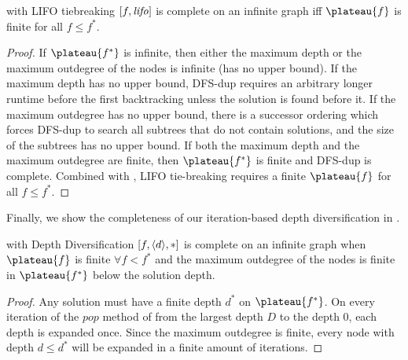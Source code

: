 \begin{propo} %
 \astar with LIFO tiebreaking $[f,{\text{\textit{lifo}}}]$ is complete on an infinite graph iff
 $\plateau{f}$ is finite for all $f\leq f^*$.
\end{propo}

\begin{proof}
 If $\plateau{f^*}$ is infinite, then
 either the maximum depth or the maximum outdegree of the nodes is infinite (has no upper bound).
 If the maximum depth has no upper bound,
 DFS-dup requires an arbitrary longer runtime before the first backtracking
 unless the solution is found before it.
 If the maximum outdegree has no upper bound,
 there is a successor ordering which forces DFS-dup
 to search all subtrees that do not contain solutions, and
 the size of the subtrees has no upper bound.
 If both the maximum depth and the maximum outdegree are finite, then $\plateau{f^*}$ is finite
 and DFS-dup is complete.
 Combined with ,
 LIFO tie-breaking requires a finite $\plateau{f}$ for all $f\leq f^*$.
\end{proof}

Finally, we show the completeness of our iteration-based depth diversification in .

\begin{theo}
 \astar with Depth Diversification $[f,{\left<d\right>},*]$ is complete on an infinite graph when
 $\plateau{f}$ is finite  $\forall f<f^*$ and
 the maximum outdegree of the nodes is finite in $\plateau{f^*}$ below the solution depth.
\end{theo}
 
\begin{proof}
 Any solution must have a finite depth $d^*$ on $\plateau{f^*}$.
 On every iteration of the $pop$ method of  from the largest depth $D$ to the depth 0, each depth is expanded once.
 Since the maximum outdegree is finite,
 every node with depth $d\leq d^*$ will be expanded in a finite amount of iterations.
\end{proof}

